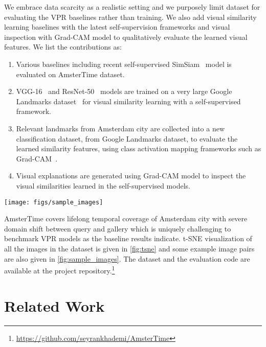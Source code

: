 \documentclass[a4paper,conference]{IEEEtran}
\begin{document}
We embrace data scarcity as a realistic setting and we purposely limit \amstertime dataset for evaluating the VPR baselines rather than training. We also add visual similarity learning baselines with the latest self-supervision frameworks and visual inspection with Grad-CAM \cite{selvaraju2017grad} model to qualitatively evaluate the learned visual features. We list the contributions as:

\begin{enumerate}
\item Various baselines including  recent self-supervised SimSiam~\cite{chen2020simsiam} model is evaluated on AmsterTime dataset.
     \item VGG-16~\cite{simonyan2014very} and ResNet-50~\cite{he2016deep} models are trained on a very large Google Landmarks  dataset~\cite{weyand2020google} for visual similarity learning with a self-supervised framework.
     \item Relevant landmarks from Amsterdam city are collected into a new classification dataset, from Google Landmarks dataset, to evaluate the learned similarity features, using class activation mapping frameworks such as Grad-CAM~\cite{selvaraju2017grad}.
     \item Visual explanations are generated using Grad-CAM model to inspect the visual similarities learned in the self-supervised models. 
\end{enumerate}

\begin{figure*}[t]
\centering
\texttt{[image: figs/sample\_images]}
\caption{Sample image pairs from \amstertime dataset. Challenges are extreme occlusions, view point changes, camera lens distortions, color changes.}
\label{fig:sample_images}
\end{figure*}

AmsterTime covers lifelong temporal coverage of Amsterdam city with severe domain shift between query and gallery which is uniquely challenging to benchmark VPR models as the baseline results indicate. t-SNE visualization of all the images in the dataset is given in \cref{fig:tsne} and some example image pairs are also given in \cref{fig:sample_images}. The dataset and the evaluation code are available at the project repository.\footnote{\href{https://github.com/seyrankhademi/AmsterTime}{https://github.com/seyrankhademi/AmsterTime}} \section{Related Work}
\label{sec:related_work}
\end{document}
